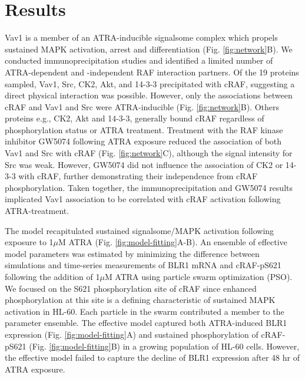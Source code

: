 \documentclass[10pt,twocolumn,twoside,final]{IEEEtran}
\begin{document}

\section{Results}

Vav1 is a member of an ATRA-inducible signalsome complex which propels sustained MAPK activation, arrest and differentiation (Fig. \ref{fig:network}B).
We conducted immunoprecipitation studies and identified a limited number of ATRA-dependent and -independent RAF interaction partners.
Of the 19 proteins sampled, Vav1, Src, CK2, Akt, and 14-3-3 precipitated with cRAF,
suggesting a direct physical interaction was possible.
However, only the associations between cRAF and Vav1 and Src were ATRA-inducible (Fig. \ref{fig:network}B).
Others proteins e.g., CK2, Akt and 14-3-3, generally bound cRAF regardless of phosphorylation status or ATRA treatment.
Treatment with the RAF kinase inhibitor GW5074 following ATRA exposure reduced the association of both Vav1 and Src with cRAF (Fig. \ref{fig:network}C),
although the signal intensity for Src was weak.
However, GW5074 did not influence the association of CK2 or 14-3-3 with cRAF,
further demonstrating their independence from cRAF phosphorylation.
Taken together, the immunoprecipitation and GW5074 results implicated Vav1 association to be correlated with cRAF activation following ATRA-treatment.

The model recapitulated sustained signalsome/MAPK activation following exposure to 1$\mu$M ATRA (Fig. \ref{fig:model-fitting}A-B).
An ensemble of effective model parameters was estimated by minimizing the difference between simulations and time-series measurements of BLR1 mRNA and
cRAF-pS621 following the addition of 1$\mu$M ATRA using particle swarm optimization (PSO).
We focused on the S621 phosphorylation site of cRAF since enhanced phosphorylation at this site is a defining characteristic of  sustained MAPK activation in HL-60.
Each particle in the swarm contributed a member to the parameter ensemble.
The effective model captured both ATRA-induced BLR1 expression (Fig. \ref{fig:model-fitting}A) and sustained phosphorylation of cRAF-pS621 (Fig. \ref{fig:model-fitting}B)
in a growing population of HL-60 cells.
However, the effective model failed to capture the decline of BLR1 expression after 48 hr of ATRA exposure.
\end{document}
